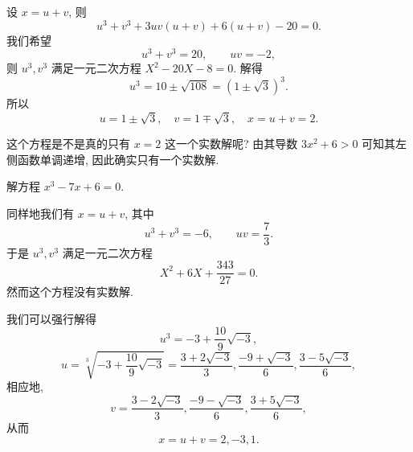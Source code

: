 \begin{solution}
  设 $x=u+v$, 则
  \[
    u^3+v^3+3uv(u+v)+6(u+v)-20=0.
  \]
  我们希望
  \[
    u^3+v^3=20,\qquad uv=-2,
  \]
  则 $u^3,v^3$ 满足一元二次方程 $X^2-20X-8=0$.
  解得
  \[
    u^3=10\pm\sqrt{108}=(1\pm\sqrt3)^3.
  \]
  所以
  \[
    u=1\pm\sqrt3,\quad v=1\mp\sqrt 3,\quad x=u+v=2.
  \]
\end{solution}

这个方程是不是真的只有 $x=2$ 这一个实数解呢?
由其导数 $3x^2+6>0$ 可知其左侧函数单调递增, 因此确实只有一个实数解.


\begin{example}
  解方程 $x^3-7x+6=0$.
\end{example}

\begin{solution}
  同样地我们有 $x=u+v$, 其中
  \[
    u^3+v^3=-6,\qquad uv=\frac73.
  \]
  于是 $u^3,v^3$ 满足一元二次方程
  \[
    X^2+6X+\dfrac{343}{27}=0.
  \]
  然而这个方程没有实数解.

  我们可以强行解得
  \[
    u^3=-3+\frac{10}9\sqrt{-3},
  \]
  \[
    u=\sqrt[3]{-3+\frac{10}9\sqrt{-3}}
     =\frac{3+2\sqrt{-3}}3,\frac{-9+\sqrt{-3}}6,\frac{3-5\sqrt{-3}}6,
  \]
  相应地,
  \[
    v=\frac{3-2\sqrt{-3}}3,
      \frac{-9-\sqrt{-3}}6,
      \frac{3+5\sqrt{-3}}6,
  \]
  从而
  \[
    x=u+v=2,-3,1.
  \]
\end{solution}

